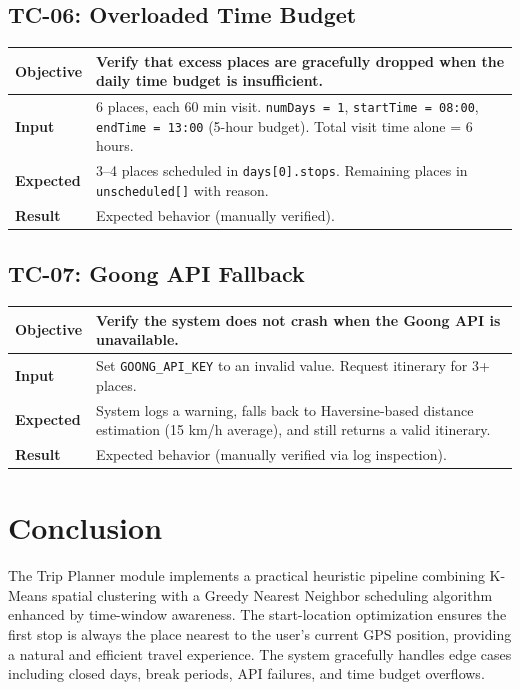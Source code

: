 \documentclass[12pt,a4paper]{report}
\begin{document}
\subsection{TC-06: Overloaded Time Budget}

\begin{table}[H]
\centering
\begin{tabular}{|p{3cm}|p{10cm}|}
\hline
\textbf{Objective} & Verify that excess places are gracefully dropped when the daily time budget is insufficient. \\
\hline
\textbf{Input} & 6 places, each 60 min visit. \texttt{numDays = 1}, \texttt{startTime = 08:00}, \texttt{endTime = 13:00} (5-hour budget). Total visit time alone = 6 hours. \\
\hline
\textbf{Expected} & 3--4 places scheduled in \texttt{days[0].stops}. Remaining places in \texttt{unscheduled[]} with reason. \\
\hline
\textbf{Result} & Expected behavior (manually verified). \\
\hline
\end{tabular}
\end{table}

\subsection{TC-07: Goong API Fallback}

\begin{table}[H]
\centering
\begin{tabular}{|p{3cm}|p{10cm}|}
\hline
\textbf{Objective} & Verify the system does not crash when the Goong API is unavailable. \\
\hline
\textbf{Input} & Set \texttt{GOONG\_API\_KEY} to an invalid value. Request itinerary for 3+ places. \\
\hline
\textbf{Expected} & System logs a warning, falls back to Haversine-based distance estimation (15 km/h average), and still returns a valid itinerary. \\
\hline
\textbf{Result} & Expected behavior (manually verified via log inspection). \\
\hline
\end{tabular}
\end{table}

\section{Conclusion}

The Trip Planner module implements a practical heuristic pipeline combining K-Means spatial clustering with a Greedy Nearest Neighbor scheduling algorithm enhanced by time-window awareness. The start-location optimization ensures the first stop is always the place nearest to the user's current GPS position, providing a natural and efficient travel experience. The system gracefully handles edge cases including closed days, break periods, API failures, and time budget overflows.
\end{document}
